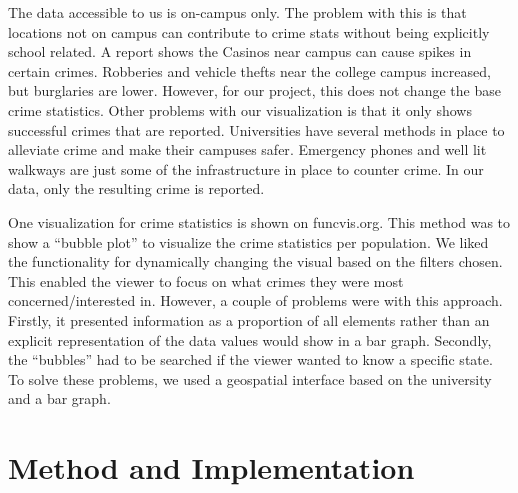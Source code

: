 \documentclass[journal]{vgtc}                %
\begin{document}
The data accessible to us is on-campus only. The problem with this is that locations not on campus can contribute to crime stats without being explicitly school related.  A report shows the Casinos near campus can cause spikes in certain crimes.  Robberies and vehicle thefts near the college campus increased, but burglaries are lower\cite{Thomas:2011:CRIME}.  However, for our project, this does not change the base crime statistics.
Other problems with our visualization is that it only shows successful crimes that are reported.  Universities have several methods in place to alleviate crime and make their campuses safer\cite{doi:10.1177/0193841X13509815}.  Emergency phones and well lit walkways are just some of the infrastructure in place to counter crime.  In our data, only the resulting crime is reported.

One visualization for crime statistics is shown on funcvis.org\cite{kogan_2013}.  This method was to show a ``bubble plot'' to visualize the crime statistics per population.  We liked the functionality for dynamically changing the visual based on the filters chosen.  This enabled the viewer to focus on what crimes they were most concerned/interested in.  However, a couple of problems were with this approach.  Firstly, it presented information as a proportion of all elements rather than an explicit representation of the data values would show in a bar graph.  Secondly, the ``bubbles'' had to be searched if the viewer wanted to know a specific state.  To solve these problems, we used a geospatial interface based on the university and a bar graph.
\section{Method and Implementation} \label{methods}
\end{document}
